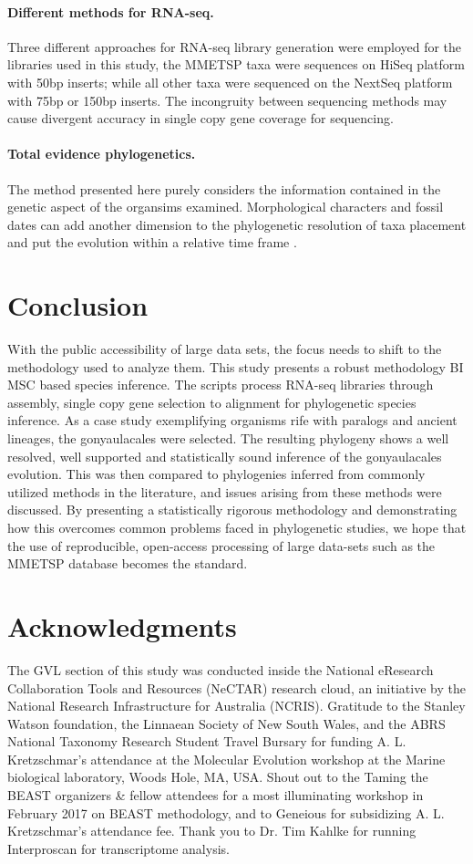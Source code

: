 \documentclass[12pt]{article}
\begin{document}
\paragraph*{Different methods for RNA-seq.} 
Three different approaches for RNA-seq library generation were employed for the libraries used in this study, the MMETSP taxa were sequences on HiSeq platform with 50bp inserts; while all other taxa were sequenced on the NextSeq platform with 75bp or 150bp inserts. 
The incongruity between sequencing methods may cause divergent accuracy in single copy gene coverage for sequencing.  
\paragraph*{Total evidence phylogenetics.}
The method presented here purely considers the information contained in the genetic aspect of the organsims examined. 
Morphological characters and fossil dates can add another dimension to the phylogenetic resolution of taxa placement and put the evolution within a relative time frame \cite{gavryushkina2017bayesian}.  

\newpage
\section{Conclusion}
With the public accessibility of large data sets, the focus needs to shift to the methodology used to analyze them. 
This study presents a robust methodology BI MSC based species inference. 
The scripts process RNA-seq libraries through assembly, single copy gene selection to alignment for phylogenetic species inference. 
As a case study exemplifying organisms rife with paralogs and ancient lineages, the gonyaulacales were selected. 
The resulting phylogeny shows a well resolved, well supported and statistically sound inference of the gonyaulacales evolution. 
This was then compared to phylogenies inferred from commonly utilized methods in the literature, and issues arising from these methods were discussed. 
By presenting a statistically rigorous methodology and demonstrating how this overcomes common problems faced in phylogenetic studies, we hope that the use of reproducible, open-access processing of large data-sets such as the MMETSP database becomes the standard.  
\newpage

\section{Acknowledgments}
The GVL section of this study was conducted inside the National eResearch Collaboration Tools and Resources (NeCTAR) research cloud, an initiative by the National Research Infrastructure for Australia (NCRIS).
Gratitude to the Stanley Watson foundation, the Linnaean Society of New South Wales, and the ABRS National Taxonomy Research Student Travel Bursary for funding A. L. Kretzschmar's attendance at the Molecular Evolution workshop at the Marine biological laboratory, Woods Hole, MA, USA.
Shout out to the Taming the BEAST organizers \& fellow attendees for a most illuminating workshop in February 2017 on BEAST methodology, and to Geneious for subsidizing A. L. Kretzschmar's attendance fee.
Thank you to Dr. Tim Kahlke for running Interproscan for transcriptome analysis.
\end{document}

